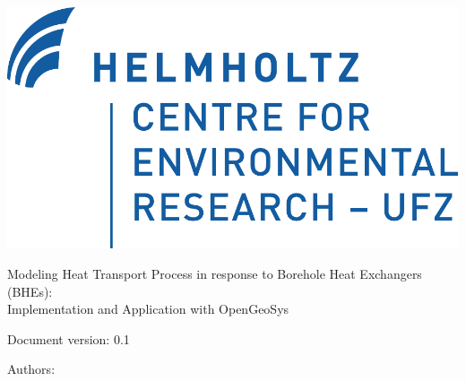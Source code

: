 \begin{titlepage}

\begin{flushright}
\includegraphics[height=0.1\textheight]{fig/UFZ_logo}
\end{flushright}


\vspace{20mm}

\begin{center}
{\huge{Modeling Heat Transport Process in response to Borehole Heat Exchangers (BHEs): \\ 
Implementation and Application with OpenGeoSys}}

\vfill
{\large{Document version: 0.1}}
\end{center}

\vspace{20mm}
{\large{Authors:}}

{\large{
\@author}}

\end{titlepage}